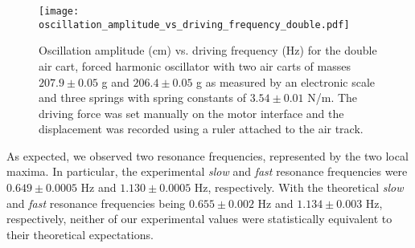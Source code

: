 \begin{figure}[H]
    \centering
	\texttt{[image: oscillation\_amplitude\_vs\_driving\_frequency\_double.pdf]}
	\label{fig::resonanceSingle}
	\caption{Oscillation amplitude (cm) vs. driving frequency (Hz) for the double air cart, forced harmonic oscillator with two air carts of masses $207.9 \pm 0.05$ g and $206.4 \pm 0.05$ g as measured by an electronic scale and three springs with spring constants of $3.54 \pm 0.01$ N/m. The driving force was set manually on the motor interface and the displacement was recorded using a ruler attached to the air track.}
\end{figure}

As expected, we observed two resonance frequencies, represented by the two local maxima. In particular, the experimental \textit{slow} and \textit{fast} resonance frequencies were $0.649 \pm 0.0005$ Hz and $1.130 \pm 0.0005$ Hz, respectively. With the theoretical \textit{slow} and \textit{fast} resonance frequencies being $0.655 \pm 0.002$ Hz and $1.134 \pm 0.003$ Hz, respectively, neither of our experimental values were statistically equivalent to their theoretical expectations.












